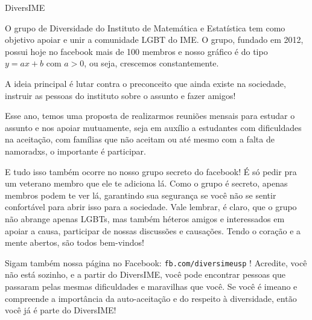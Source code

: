 \begin{secao}{DiversIME}

O grupo de Diversidade do Instituto de Matemática e Estatística tem como objetivo
 apoiar e unir a comunidade LGBT do IME. O grupo, fundado em 2012, possui hoje
 no facebook mais de 100 membros e nosso gráfico é do tipo $y = ax + b$ com $a > 0$,
 ou seja, crescemos constantemente.

A ideia principal é lutar contra o preconceito que ainda existe na sociedade,
 instruir as pessoas do instituto sobre o assunto e fazer amigos!

Esse ano, temos uma proposta de realizarmos reuniões mensais para estudar o
 assunto e nos apoiar mutuamente, seja em auxílio a estudantes com dificuldades
 na aceitação, com famílias que não aceitam ou até mesmo com a falta de
 namoradxs, o importante é participar.

E tudo isso também ocorre no nosso grupo secreto do facebook! É só pedir pra um
 veterano membro que ele te adiciona lá. Como o grupo é secreto, apenas membros
 podem te ver lá, garantindo sua segurança se você não se sentir confortável
 para abrir isso para a sociedade. Vale lembrar, é claro, que o grupo não
 abrange apenas LGBTs, mas também héteros amigos e interessados em apoiar
 a causa, participar de nossas discussões e causações. Tendo o coração e a mente
 abertos, são todos bem-vindos!

Sigam também nossa página no Facebook: {\tt fb.com/diversimeusp} !
Acredite, você não está sozinho, e a partir do DiversIME, você pode encontrar
 pessoas que passaram pelas mesmas dificuldades e maravilhas que você. Se você
 é imeano e compreende a importância da auto-aceitação e do respeito à
 diversidade, então você já é parte do DiversIME!

\end{secao}

